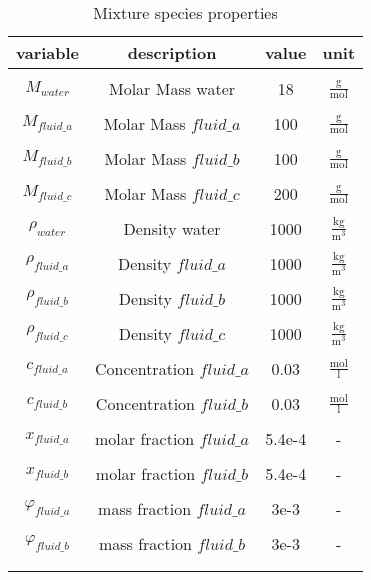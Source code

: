 \documentclass[../thesis.tex]{subfiles}
\begin{document}
\begin{table} [htb]
	\centering
	\caption{Mixture species properties}
	\begin{tabular}{ cccc }
		\hline
		variable & description & value & unit \\
		\hline
		\\[-1em]
		$M_{water}$ & Molar Mass water & 18 & $\frac{\mathrm{g}}{\mathrm{mol}}$ \\
		\\[-1em]
		$M_{fluid\_a}$ & Molar Mass $fluid\_a$ & 100 & $\frac{\mathrm{g}}{\mathrm{mol}}$ \\
		\\[-1em]
		$M_{fluid\_b}$ & Molar Mass $fluid\_b$ & 100 & $\frac{\mathrm{g}}{\mathrm{mol}}$ \\
		\\[-1em]
		$M_{fluid\_c}$ & Molar Mass $fluid\_c$ & 200 & $\frac{\mathrm{g}}{\mathrm{mol}}$ \\
		\\[-1em]
		$\rho_{water}$ & Density water & 1000 & $\frac{\mathrm{kg}}{\mathrm{m}^3}$ \\
		\\[-1em]
		$\rho_{fluid\_a}$ & Density $fluid\_a$ & 1000 & $\frac{\mathrm{kg}}{\mathrm{m}^3}$ \\
		\\[-1em]
		$\rho_{fluid\_b}$ & Density $fluid\_b$ & 1000 & $\frac{\mathrm{kg}}{\mathrm{m}^3}$ \\
		\\[-1em]
		$\rho_{fluid\_c}$ & Density $fluid\_c$ & 1000 & $\frac{\mathrm{kg}}{\mathrm{m}^3}$ \\
		\\[-1em]
		$c_{fluid\_a}$ & Concentration $fluid\_a$ & 0.03 & $\frac{\mathrm{mol}}{\mathrm{l}}$ \\
		\\[-1em]
		$c_{fluid\_b}$ & Concentration $fluid\_b$ & 0.03 & $\frac{\mathrm{mol}}{\mathrm{l}}$ \\
		\\[-1em]
		$x_{fluid\_a}$ & molar fraction $fluid\_a$ & 5.4e-4 & - \\
		\\[-1em]
		$x_{fluid\_b}$ & molar fraction $fluid\_b$ & 5.4e-4 & - \\
		\\[-1em]
		$\varphi_{fluid\_a}$ & mass fraction $fluid\_a$ & 3e-3 & - \\
		\\[-1em]
		$\varphi_{fluid\_b}$ & mass fraction $fluid\_b$ & 3e-3 & - \\
		\\[-1em]
		\hline
		\label{tab:ansys_setup_molefrac}
	\end{tabular}
\end{table}
\end{document}
